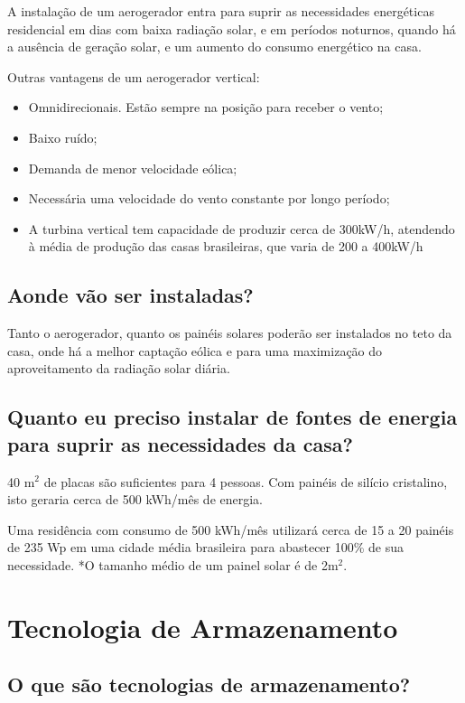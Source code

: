 	A instalação de um aerogerador entra para suprir as necessidades energéticas residencial em dias com baixa radiação solar, e em períodos noturnos, quando há a ausência de geração solar, e um aumento do consumo energético na casa.\cite{energygovplanning}\cite{globoaerogeradores}

	Outras vantagens de um aerogerador vertical:
	\begin{itemize}
		\item Omnidirecionais. Estão sempre na posição para receber o vento;
		\item Baixo ruído;
		\item Demanda de menor velocidade eólica;
		\item Necessária uma velocidade do vento constante por longo período;
		\item A turbina vertical tem capacidade de produzir cerca de 300kW/h, atendendo à média de produção das casas brasileiras, que varia de 200 a 400kW/h
	\end{itemize}

\subsection{Aonde vão ser instaladas?}

	Tanto o aerogerador, quanto os painéis solares poderão ser instalados no teto da casa, onde há a melhor captação eólica e para uma maximização do aproveitamento da radiação solar diária.

\subsection{Quanto eu preciso instalar de fontes de energia para suprir as necessidades da casa?}

	40 m$^{2}$ de placas são suficientes para 4 pessoas. Com painéis de silício cristalino, isto geraria cerca de 500 kWh/mês de energia.

	Uma residência com consumo de 500 kWh/mês utilizará cerca de 15 a 20 painéis de 235 Wp em uma cidade média brasileira para abastecer 100\% de sua necessidade. *O tamanho médio de um painel solar é de 2m$^{2}$.

\section{Tecnologia de Armazenamento}
\subsection{O que são tecnologias de armazenamento?}


